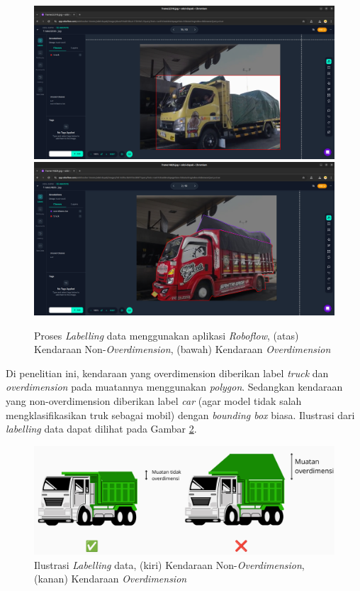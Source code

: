 \begin{figure}[htbp]
  \centering

  \includegraphics[scale=0.2]{gambar/bab3-labelling-data-nonoverdimension.png}
  \includegraphics[scale=0.2]{gambar/bab3-labelling-data-overdimension.png}

  \caption{\centering Proses \emph{Labelling} data menggunakan aplikasi \emph{Roboflow}, (atas) Kendaraan Non-\emph{Overdimension}, (bawah) Kendaraan \emph{Overdimension}}
  \label{fig:labellingdata}
\end{figure}

Di penelitian ini, kendaraan yang overdimension diberikan label \emph{truck} dan \emph{overdimension} pada muatannya menggunakan \emph{polygon}. Sedangkan kendaraan yang non-overdimension diberikan label \emph{car} (agar model tidak salah mengklasifikasikan truk sebagai mobil) dengan \emph{bounding box} biasa. Ilustrasi dari \emph{labelling} data dapat dilihat pada Gambar \ref{fig:labellingdataillustration}.

\begin{figure}[htbp]
  \centering
  \includegraphics[scale=0.25]{gambar/bab3-truck-detection-method.png}

  \caption{\centering Ilustrasi \emph{Labelling} data, (kiri) Kendaraan Non-\emph{Overdimension}, (kanan) Kendaraan \emph{Overdimension}}
  \label{fig:labellingdataillustration}
\end{figure}


